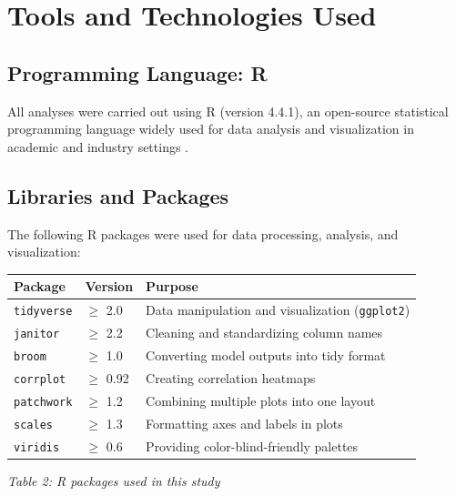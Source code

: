 \documentclass[12pt,a4paper]{article}
\begin{document}
\section{Tools and Technologies Used}

\subsection{Programming Language: R}

All analyses were carried out using R (version 4.4.1), an open-source
statistical programming language widely used for data analysis and
visualization in academic and industry settings \citep{rcoreteam2023}.

\subsection{Libraries and Packages}

The following R packages were used for data processing, analysis, and
visualization:

\begin{table}[ht]
\centering

\begin{tabular}{@{}lll@{}}
\toprule
\textbf{Package}   & \textbf{Version} & \textbf{Purpose} \\
\midrule
\texttt{tidyverse} & $\geq$ 2.0   & Data manipulation and visualization (\texttt{ggplot2}) \\
\texttt{janitor}   & $\geq$ 2.2   & Cleaning and standardizing column names \\
\texttt{broom}     & $\geq$ 1.0   & Converting model outputs into tidy format \\
\texttt{corrplot}  & $\geq$ 0.92  & Creating correlation heatmaps \\
\texttt{patchwork} & $\geq$ 1.2   & Combining multiple plots into one layout \\
\texttt{scales}    & $\geq$ 1.3   & Formatting axes and labels in plots \\
\texttt{viridis}   & $\geq$ 0.6   & Providing color-blind-friendly palettes \\
\bottomrule
\end{tabular}

\vspace{0.3cm}

{\centering \textit{Table 2: R packages used in this study}\par}

\label{tab:packages}

\end{table}
\end{document}
